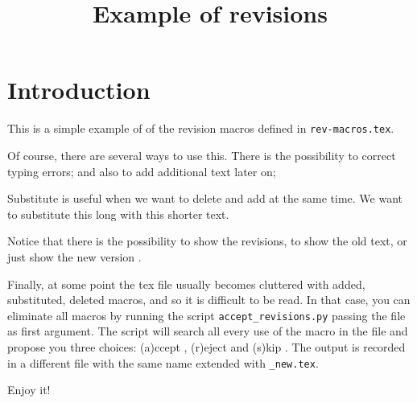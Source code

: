 \documentclass{article}
\title{Example of revisions}
\begin{document}
\maketitle

\section{Introduction}

This is a simple example of  of the revision
macros defined in \texttt{rev-macros.tex}. 

Of course, there are several ways to use this. There is the
possibility to correct typing errors; and also to add
additional text later on; 

Substitute is useful when we want to delete and add at the same
time. We want to substitute this long  with this shorter text.

Notice that there is the possibility to show the revisions,  to show the
old text,  or just show the new
version .

Finally, at some point the tex file usually becomes cluttered with
added, substituted, deleted macros, and so it is difficult to be
read. In that case, you can eliminate all macros by running the
 script \texttt{accept\_revisions.py} passing the file
as first argument. The script will search all every use of the macro
in the file and propose you three choices: (a)ccept , (r)eject  and (s)kip
. The output is recorded in a
different file with the same name extended with \texttt{\_new.tex}.

Enjoy it! 
\end{document}
